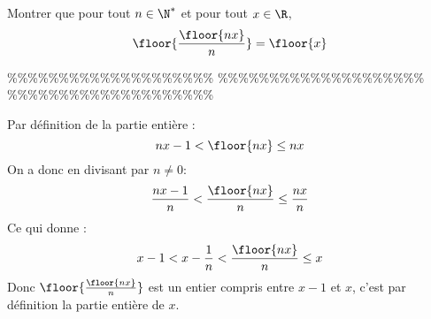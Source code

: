 


\begin{exercice}
Montrer que pour tout $n\in \N^*$ et pour tout $x\in \R$, 
$$\floor{\frac{\floor{nx}}{n}} =\floor{x}$$

\end{exercice}


\%\%\%\%\%\%\%\%\%\%\%\%\%\%\%\%\%\%\%\%
\%\%\%\%\%\%\%\%\%\%\%\%\%\%\%\%\%\%\%\%
\%\%\%\%\%\%\%\%\%\%\%\%\%\%\%\%\%\%\%\%




\begin{correction}
Par définition de la partie entière : 
$$nx-1<\floor{nx}\leq nx$$
On a donc en divisant par $n\neq 0$:
$$\frac{nx-1}{n}<\frac{\floor{nx}}{n} \leq \frac{nx}{n}$$
Ce qui donne : 
$$x-1<x-\frac{1}{n}<\frac{\floor{nx}}{n} \leq x$$
Donc 
$\floor{\frac{\floor{nx}}{n}}$ est un entier compris entre $x-1 $ et $x$, c'est par définition la partie entière de $x$. 


\end{correction}